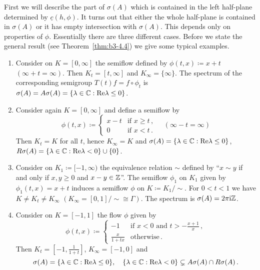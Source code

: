 First we will describe the part of $\sigma(A)$ which is contained in the left half-plane determined by $\underline{c}(h,\phi)$.
It turns out that either the whole half-plane is contained in $\sigma(A)$ or it has empty intersection with $\sigma(A)$.
This depends only on properties of $\phi$.
Essentially there 
are three different cases. 
Before we state the general result (see Theorem~\ref{thm:b3-4.4}) we give some typical examples.
\begin{examples}\label{ex:b3-4.3}%
	\begin{enumerate}[\upshape (i), wide, labelindent=.5em]
	\item 
	Consider on $K = [0,\infty]$ the semiflow defined by $\phi(t,x) \coloneq x + t$ $(\infty + t = \infty)$.
	Then $K_{t} = [t,\infty]$ and $K_{\infty} = \{\infty\}$.
	The spectrum of the corresponding semigroup $T(t)f = f\circ\phi_{t}$ is $\sigma(A) = A\sigma(A) = \{\lambda \in \mathbb{C} : \mathop{}\!\mathrm{Re}\lambda \leq 0\}$.
	
	\item 
	Consider again $K = [0,\infty]$ and define a semiflow by
	\[
	\phi(t,x) \coloneq \begin{cases} 
		x - t & \text{if } x \geq t \,,\\
		0 & \text{if } x < t \,.
	\end{cases} \quad (\infty - t = \infty)
	\]
	Then $K_{t} = K$ for all $t$, hence $K_{\infty} = K$ and $\sigma(A) = \{\lambda \in \mathbb{C} : \mathop{}\!\mathrm{Re}\lambda \leq 0\}$, $R\sigma(A) = \{\lambda \in \mathbb{C} : \mathop{}\!\mathrm{Re}\lambda < 0\} \cup \{0\}$.
	
	\item 
	Consider on $K_{1} \coloneq [-1,\infty)$ the equivalence relation $\sim$ defined by \enquote{$x \sim y$ if and only if $x,y \geq 0$ and $x - y \in \mathbb{Z}$}.
	The semiflow $\phi_{1}$ on $K_{1}$ given by $\phi_{1}(t,x) = x + t$ induces a semiflow $\phi$ on $K \coloneq K_{1}/{\sim}$.
	For $0 < t < 1$ we have $K \neq K_{t} \neq K_{\infty}$ $(K_{\infty} = [0,1]/{\sim} \cong \Gamma)$.
	The spectrum is $\sigma(A) = 2\pi \mathrm{i}\mathbb{Z}$.
	
	\item 
	Consider on $K = [-1,1]$ the flow $\phi$ given by
	\[
	\phi(t,x)\coloneq \begin{cases}
		-1 & \text{if } x < 0 \text{ and } t > -\frac{x+1}{x} \,, \\
		\frac{x}{1+tx} & \text{otherwise} \,.
	\end{cases}
	\]
	Then $K_{t} = [-1,\frac{1}{1+t}]$, $K_{\infty} = [-1,0]$ and
	\[
	\sigma(A) = \{\lambda \in \mathbb{C} : \mathop{}\!\mathrm{Re}\lambda \leq 0\},\quad 
	\{\lambda \in \mathbb{C} : \mathop{}\!\mathrm{Re}\lambda < 0\} \subsetneq A\sigma(A)\cap R\sigma(A)\,.
	\]
	\end{enumerate}
\end{examples}
